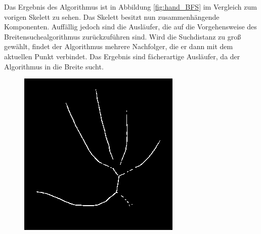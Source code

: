 Das Ergebnis des Algorithmus ist in Abbildung \ref{fig:hand_BFS} im Vergleich zum vorigen Skelett zu sehen.
Das Skelett besitzt nun zusammenhängende Komponenten. Auffällig jedoch sind die Ausläufer, die auf die 
Vorgehensweise des Breitensuchealgorithmus zurückzuführen sind. Wird die Suchdistanz zu groß gewählt,
findet der Algorithmus mehrere Nachfolger, die er dann mit dem aktuellen Punkt verbindet. Das Ergebnis
sind fächerartige Ausläufer, da der Algorithmus in die Breite sucht. %
\begin{figure}[htbp]
	\centering
	\begin{minipage}{5cm}
		\centering
		\includegraphics[width=1.0\linewidth]{./fig/hand-skelett}
	\end{minipage}
	\hspace{2cm}
	\begin{minipage}{5cm}
		\centering

\end{minipage}
\end{figure}
